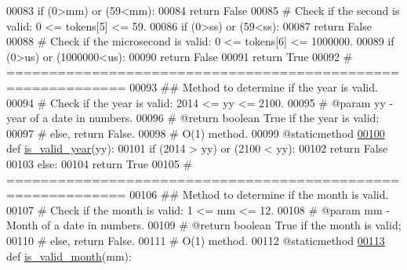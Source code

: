 \begin{DoxyCode}
00083         \textcolor{keywordflow}{if} (0>mm) \textcolor{keywordflow}{or} (59<mm):
00084             \textcolor{keywordflow}{return} \textcolor{keyword}{False}
00085         \textcolor{comment}{# Check if the second is valid: 0 <= tokens[5] <= 59.}
00086         \textcolor{keywordflow}{if} (0>ss) \textcolor{keywordflow}{or} (59<ss):
00087             \textcolor{keywordflow}{return} \textcolor{keyword}{False}
00088         \textcolor{comment}{# Check if the microsecond is valid: 0 <= tokens[6] <= 1000000.}
00089         \textcolor{keywordflow}{if} (0>us) \textcolor{keywordflow}{or} (1000000<us):
00090             \textcolor{keywordflow}{return} \textcolor{keyword}{False}
00091         \textcolor{keywordflow}{return} \textcolor{keyword}{True}
00092     \textcolor{comment}{# ============================================================}
00093     \textcolor{comment}{##  Method to determine if the year is valid.}
00094     \textcolor{comment}{#   Check if the year is valid: 2014 <= yy <= 2100.}
00095     \textcolor{comment}{#   @param yy - year of a date in numbers.}
00096     \textcolor{comment}{#   @return boolean True if the year is valid;}
00097     \textcolor{comment}{#       else, return False.}
00098     \textcolor{comment}{#   O(1) method.}
00099     @staticmethod
\hypertarget{date__time__processing_8py_source_l00100}{}\hyperlink{classutilities_1_1date__time__processing_1_1date__time__operations_a621d736cda0d00786c1e8803cf7fc768}{00100}     \textcolor{keyword}{def }\hyperlink{classutilities_1_1date__time__processing_1_1date__time__operations_a621d736cda0d00786c1e8803cf7fc768}{is\_valid\_year}(yy):
00101         \textcolor{keywordflow}{if} (2014 > yy) \textcolor{keywordflow}{or} (2100 < yy):
00102             \textcolor{keywordflow}{return} \textcolor{keyword}{False}
00103         \textcolor{keywordflow}{else}:
00104             \textcolor{keywordflow}{return} \textcolor{keyword}{True}
00105     \textcolor{comment}{# ============================================================}
00106     \textcolor{comment}{##  Method to determine if the month is valid.}
00107     \textcolor{comment}{#   Check if the month is valid: 1 <= mm <= 12.}
00108     \textcolor{comment}{#   @param mm - Month of a date in numbers.}
00109     \textcolor{comment}{#   @return boolean True if the month is valid;}
00110     \textcolor{comment}{#       else, return False.}
00111     \textcolor{comment}{#   O(1) method.}
00112     @staticmethod
\hypertarget{date__time__processing_8py_source_l00113}{}\hyperlink{classutilities_1_1date__time__processing_1_1date__time__operations_a7ca9f5b1f8592678a4485eb1b9618917}{00113}     \textcolor{keyword}{def }\hyperlink{classutilities_1_1date__time__processing_1_1date__time__operations_a7ca9f5b1f8592678a4485eb1b9618917}{is\_valid\_month}(mm):

\end{DoxyCode}
